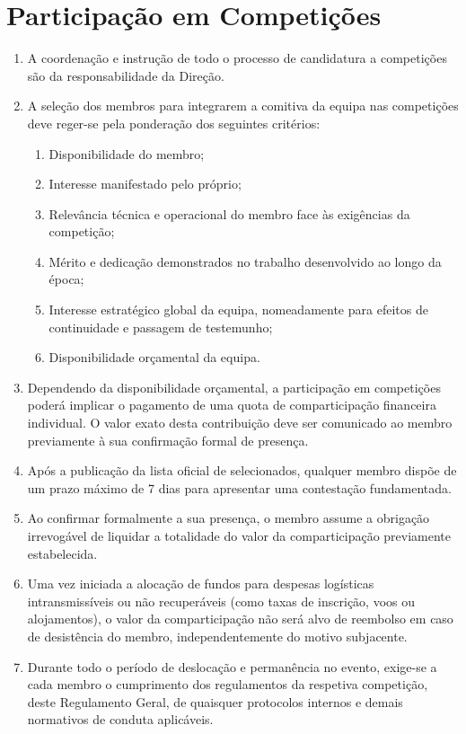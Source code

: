 \section{Participação em Competições}
\begin{enumerate}
  \item A coordenação e instrução de todo o processo de candidatura a competições são da responsabilidade da Direção.
  \item A seleção dos membros para integrarem a comitiva da equipa nas competições deve reger-se pela ponderação dos seguintes critérios:
  \begin{enumerate}
    \item Disponibilidade do membro;
    \item Interesse manifestado pelo próprio;
    \item Relevância técnica e operacional do membro face às exigências da competição;
    \item Mérito e dedicação demonstrados no trabalho desenvolvido ao longo da época;
    \item Interesse estratégico global da equipa, nomeadamente para efeitos de continuidade e passagem de testemunho;
    \item Disponibilidade orçamental da equipa.
  \end{enumerate}
  \item Dependendo da disponibilidade orçamental, a participação em competições poderá implicar o pagamento de uma quota de comparticipação financeira individual. O valor exato desta contribuição deve ser comunicado ao membro previamente à sua confirmação formal de presença.
  \item Após a publicação da lista oficial de selecionados, qualquer membro dispõe de um prazo máximo de 7 dias para apresentar uma contestação fundamentada.
  \item Ao confirmar formalmente a sua presença, o membro assume a obrigação irrevogável de liquidar a totalidade do valor da comparticipação previamente estabelecida.
  \item Uma vez iniciada a alocação de fundos para despesas logísticas intransmissíveis ou não recuperáveis (como taxas de inscrição, voos ou alojamentos), o valor da comparticipação não será alvo de reembolso em caso de desistência do membro, independentemente do motivo subjacente.
  \item Durante todo o período de deslocação e permanência no evento, exige-se a cada membro o cumprimento dos regulamentos da respetiva competição, deste Regulamento Geral, de quaisquer protocolos internos e demais normativos de conduta aplicáveis.
\end{enumerate}

